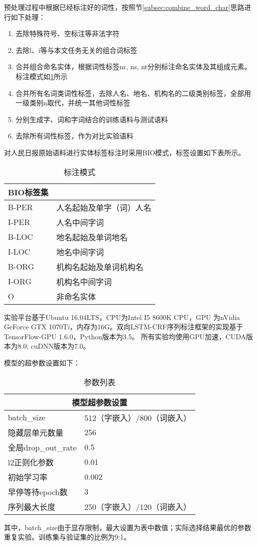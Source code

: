 预处理过程中根据已经标注好的词性，按照节\ref{subsec:combine_word_char}思路进行如下处理：
\begin{enumerate}
    \item 去除特殊符号、空标注等非法字符
    \item 去除l、i等与本文任务无关的组合词标签
    \item 合并组合命名实体，根据词性标签nr, ns, nt分别标注命名实体及其组成元素。标注模式如\ref{tab:label_schema}所示
    \item 合并所有名词类词性标签，去除人名、地名、机构名的二级类别标签，全部用一级类别n取代，并统一其他词性标签
    \item 分别生成字、词和字词结合的训练语料与测试语料
    \item 去除所有词性标签，作为对比实验语料
\end{enumerate}

对人民日报原始语料进行实体标签标注时采用BIO模式，标签设置如下表所示。

\begin{table}[H]
    \centering
    \caption{标注模式}
    \begin{tabular}{ll}
        \toprule
            BIO标签集\\
        \midrule
        B-PER & 人名起始及单字（词）人名 \\
        I-PER & 人名中间字词 \\
        B-LOC & 地名起始及单词地名 \\
        I-LOC & 地名中间字词 \\
        B-ORG & 机构名起始及单词机构名 \\
        I-ORG & 机构名中间字词 \\
        O & 非命名实体\\
        \bottomrule
    \end{tabular}
    \label{tab:label_schema}
\end{table}

实验平台基于Ubuntu 16.04LTS，CPU为Intel I5 8600K CPU，GPU 为nVidia GeForce GTX 1070Ti，内存为16G。双向LSTM-CRF序列标注框架的实现基于TensorFlow-GPU 1.6.0，Python版本为3.5。
所有实验均使用GPU加速，CUDA版本为8.0, cuDNN版本为7.0。

模型的超参数设置如下：
\begin{table}[H]
    \centering
    \caption{参数列表}
    \begin{tabular}{ll}
        \toprule
        \multicolumn{2}{c}{模型超参数设置} \\
        \midrule
        batch\_size & 512（字嵌入）/800（词嵌入） \\
        隐藏层单元数量 & 256\\
        全局drop\_out\_rate & 0.5 \\
        l2正则化参数 & 0.01 \\
        初始学习率 & 0.002 \\
        早停等待epoch数 & 3\\
        序列最大长度 & 250（字嵌入）/120（词嵌入）\\
        \bottomrule
    \end{tabular}
\end{table}
其中，batch\_size由于显存限制，最大设置为表中数值；实际选择结果最优的参数重复实验。训练集与验证集的比例为9:1。

